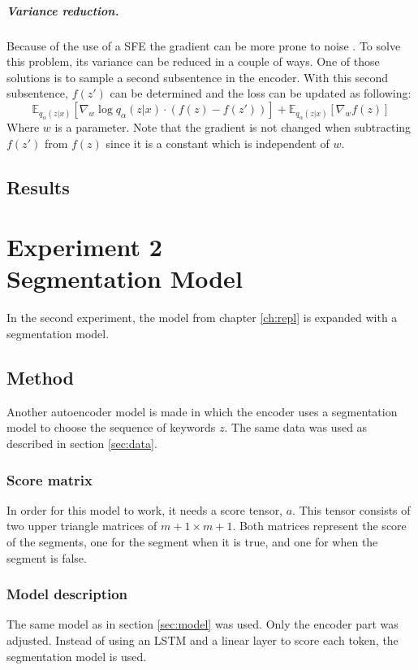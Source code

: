 \documentclass[a4paper, 12pt]{report}
\begin{document}
\paragraph{Variance reduction.} Because of the use of a SFE the gradient can be more prone to noise \cite{niculae2023discretelatentstructureneural}.
To solve this problem, its variance can be reduced in a couple of ways. 
One of those solutions is to sample a second subsentence in the encoder. 
With this second subsentence, $f(z')$ can be determined and the loss can be updated as following:
\begin{equation}
    \mathbb{E}_{q_{\alpha}(z|x)} [\nabla_w \log q_{\alpha}(z|x) \cdot (f(z)-f(z'))] + \mathbb{E}_{q_{\alpha}(z|x)} [\nabla_w f(z)]
\end{equation}
Where $w$ is a parameter. Note that the gradient is not changed when subtracting $f(z')$ from $f(z)$ since it is a constant which is independent of $w$.


\section{Results}

\chapter{Experiment 2 \\ Segmentation Model}
In the second experiment, the model from chapter \ref{ch:repl} is expanded with a segmentation model. 

\section{Method}
Another autoencoder model is made in which the encoder uses a segmentation model to choose the sequence of keywords $z$.
The same data was used as described in section \ref{sec:data}.

\subsection{Score matrix}
In order for this model to work, it needs a score tensor, $a$.
This tensor consists of two upper triangle matrices of $m+1 \times m+1$.
Both matrices represent the score of the segments, one for the segment when it is true, and one for when the segment is false.

\subsection{Model description}
The same model as in section \ref{sec:model} was used. 
Only the encoder part was adjusted.
Instead of using an LSTM and a linear layer to score each token, the segmentation model is used.
\end{document}
